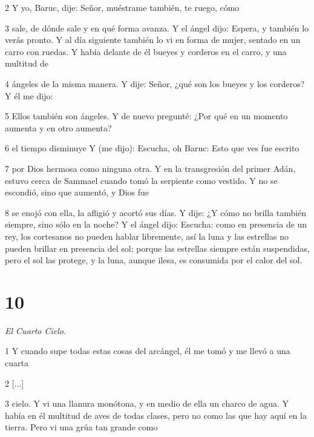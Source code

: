 \par 2 Y yo, Baruc, dije: Señor, muéstrame también, te ruego, cómo

\par 3 sale, de dónde sale y en qué forma avanza. Y el ángel dijo: Espera, y también lo verás pronto. Y al día siguiente también lo vi en forma de mujer, sentado en un carro con ruedas. Y había delante de él bueyes y corderos en el carro, y una multitud de

\par 4 ángeles de la misma manera. Y dije: Señor, ¿qué son los bueyes y los corderos? Y él me dijo:

\par 5 Ellos también son ángeles. Y de nuevo pregunté: ¿Por qué en un momento aumenta y en otro aumenta?

\par 6 el tiempo disminuye Y (me dijo): Escucha, oh Baruc: Esto que ves fue escrito

\par 7 por Dios hermosa como ninguna otra. Y en la transgresión del primer Adán, estuvo cerca de Sammael cuando tomó la serpiente como vestido. Y no se escondió, sino que aumentó, y Dios fue

\par 8 se enojó con ella, la afligió y acortó sus días. Y dije: ¿Y cómo no brilla también siempre, sino sólo en la noche? Y el ángel dijo: Escucha: como en presencia de un rey, los cortesanos no pueden hablar libremente, así la luna y las estrellas no pueden brillar en presencia del sol; porque las estrellas siempre están suspendidas, pero el sol las protege, y la luna, aunque ilesa, es consumida por el calor del sol.

\chapter{10}

\par \textit{El Cuarto Cielo.}

\par 1 Y cuando supe todas estas cosas del arcángel, él me tomó y me llevó a una cuarta

\par 2 [...]

\par 3 cielo. Y vi una llanura monótona, y en medio de ella un charco de agua. Y había en él multitud de aves de todas clases, pero no como las que hay aquí en la tierra. Pero vi una grúa tan grande como

